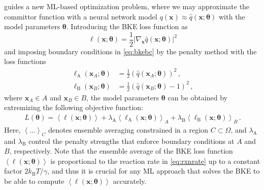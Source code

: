 \documentclass{article}
\numberwithin{equation}{section}
\def\*#1{\mathbf{#1}}
\theoremstyle{definition}
\theoremstyle{remark}
\def\thetab{\boldsymbol{\theta}}
\begin{document}
 guides a new ML-based optimization problem, where
we may approximate the committor function with a neural network model $ q(\* x) \approx \hat{q}(\* x; \thetab)$ with the model parameters $\thetab$. 
Introducing the BKE loss function as
\begin{equation}
    \ell(\* x; \thetab) = \frac{1}{2} |\nabla_{\* x} \hat{q}(\* x; \thetab)|^2 \label{eq:bkeloss}
\end{equation}
and imposing boundary conditions in \cref{eq:bkebc} by the penalty method \cite{nocedal2006numerical} with the loss functions
\begin{align}
    \ell_\mathrm{A}(\* x_A; \thetab) &= \frac{1}{2}(\hat{q}(\* x_A; \thetab))^2 \,, \label{eq:reactantloss} \\ 
    \ell_\mathrm{B}(\* x_B; \thetab) &= \frac{1}{2}(\hat{q}(\* x_B; \thetab)-1)^2 \,, \label{eq:productloss}
\end{align}
where $ \* x_A \in A $ and $ \* x_B \in B $, the model parameters $\thetab$ can be obtained by extremizing the following objective function:
\begin{gather}
L(\thetab) = \left\langle  \ell(\* x; \thetab) \right\rangle + \lambda_\mathrm{A} \left\langle \ell_\mathrm{A}(\* x; \thetab) \right\rangle_A+ \lambda_\mathrm{B} \left\langle \ell_\mathrm{B}(\* x; \thetab) \right\rangle_B \,. \label{eq:variationalbke}
\end{gather}
Here, $\left\langle \ldots \right\rangle_{C}$ denotes ensemble averaging constrained in a region $C \subset \Omega$, and $\lambda_\mathrm{A}$ and $\lambda_\mathrm{B}$ control the penalty strengths that enforce boundary conditions at $A$ and $B$, respectively. Note that the ensemble average of the BKE loss function $ \left\langle  \ell(\* x; \thetab) \right\rangle$ is proportional to the reaction rate in \cref{eq:rxnrate} up to a constant factor $2 k_\mathrm{B} T/ \gamma$, and thus it is crucial for any ML approach that solves the BKE to be able to compute $ \left\langle  \ell(\* x; \thetab) \right\rangle$ accurately.
\end{document}
